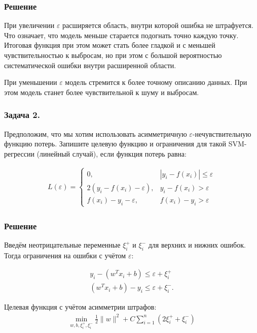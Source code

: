 \subsubsection*{Решение}
При увеличении \(\varepsilon\) расширяется область, внутри которой ошибка не штрафуется. Что означает, что модель меньше старается подогнать точно каждую точку. Итоговая функция при этом может стать более гладкой и с меньшей чувствительностью к выбросам, но при этом с большой вероятностью систематической ошибки внутри расширенной области.

При уменьшении \(\varepsilon\) модель стремится к более точному описанию данных. При этом модель станет более чувствительной к шуму и выбросам.

\subsubsection{Задача 2.}
Предположим, что мы хотим использовать асимметричную \(\varepsilon\)-нечувствительную функцию потерь. Запишите целевую функцию и ограничения для такой SVM-регрессии (линейный случай), если функция потерь равна:

\begin{align*}
    L(\varepsilon) = 
    \begin{cases}
            0, & | y_i - f(x_i) | \leq \varepsilon \\
            2(y_i - f(x_i) - \varepsilon), & y_i - f(x_i) > \varepsilon \\
            f(x_i) - y_i- \varepsilon, & f(x_i) - y_i > \varepsilon
        \end{cases}
\end{align*}

\subsubsection{Решение}
Введём неотрицательные переменные \(\xi_i^+\) и \(\xi_i^-\) для верхних и нижних ошибок. Тогда ограничения на ошибки с учётом \(\varepsilon\):

\begin{align*}
    y_i - (w^Tx_i + b) \leq \varepsilon + \xi_i^+\\
    (w^Tx_i + b) - y_i \leq \varepsilon + \xi_i^-.
\end{align*}

Целевая функция с учётом асимметрии штрафов:
\begin{align*}
    \min_{w, b, \xi_i^+, \xi_i^-} \frac{1}{2} \| w \|^2 + C \sum\limits_{i = 1}^n (2\xi_i^+ + \xi_i^-)
\end{align*}

